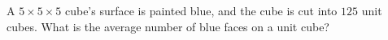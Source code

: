 A $5\times5\times5$ cube's surface is painted blue, and the cube is cut into $125$ unit cubes. What is the average number of blue faces on a unit cube?
